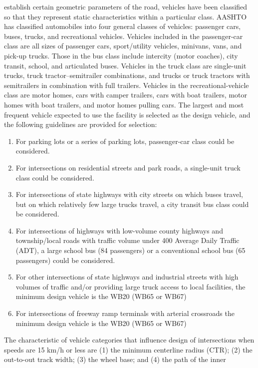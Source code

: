 establish certain geometric parameters of the road, vehicles have been classified so that they represent static characteristics within a particular class. AASHTO has classified automobiles into four general classes of vehicles: passenger cars, buses, trucks, and recreational vehicles. Vehicles included in the passenger-car class are all sizes of passenger cars, sport/utility vehicles, minivans, vans, and pick-up trucks. Those in the bus class include intercity (motor coaches), city transit, school, and articulated buses. Vehicles in the truck class are single-unit trucks, truck tractor–semitrailer combinations, and trucks or truck tractors with semitrailers in combination with full trailers. Vehicles in the recreational-vehicle class are motor homes, cars with camper trailers, cars with boat trailers, motor homes with boat trailers, and motor homes pulling cars. The largest and most frequent vehicle expected to use the facility is selected as the design vehicle, and the following
guidelines are provided for selection:
\begin{enumerate}
	\item For parking lots or a series of parking lots, passenger-car class could be considered.
	\item For intersections on residential streets and park roads, a single-unit truck class could be considered.
	\item For intersections of state highways with city streets on which buses travel, but on which relatively few large trucks travel, a city transit bus class could be considered.
	\item For intersections of highways with low-volume county highways and
	township/local roads with traffic volume under 400 Average Daily Traffic
	(ADT), a large school bus (84 passengers) or a conventional school bus
	(65 passengers) could be considered.
	\item For other intersections of state highways and industrial streets with high volumes of traffic and/or providing large truck access to local facilities, the minimum design vehicle is the WB20 (WB65 or WB67) 
	\item For intersections of freeway ramp terminals with arterial crossroads the minimum design vehicle is the WB20 (WB65 or WB67)
\end{enumerate}
The characteristic of vehicle categories that influence design of intersections
when speeds are 15 km/h or less are (1) the minimum centerline radius (CTR);
(2) the out-to-out track width; (3) the wheel base; and (4) the path of the inner
